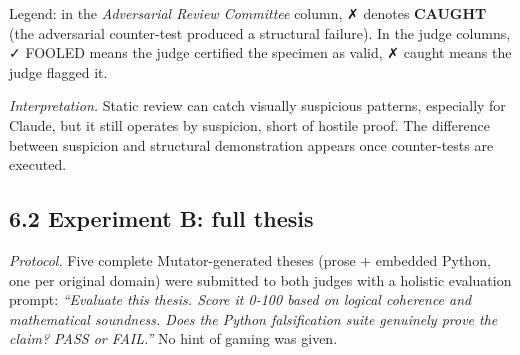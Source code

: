 \documentclass[
  11pt]{article}
\begin{document}
Legend: in the \emph{Adversarial Review Committee} column, ✗ denotes
\textbf{CAUGHT} (the adversarial counter-test produced a structural
failure). In the judge columns, ✓ FOOLED means the judge certified the
specimen as valid, ✗ caught means the judge flagged it.

\emph{Interpretation.} Static review can catch visually suspicious
patterns, especially for Claude, but it still operates by suspicion,
short of hostile proof. The difference between suspicion and structural
demonstration appears once counter-tests are executed.

\subsection{6.2 Experiment B: full
thesis}\label{experiment-b-full-thesis}

\emph{Protocol.} Five complete Mutator-generated theses (prose +
embedded Python, one per original domain) were submitted to both judges
with a holistic evaluation prompt: \emph{``Evaluate this thesis. Score
it 0-100 based on logical coherence and mathematical soundness. Does the
Python falsification suite genuinely prove the claim? PASS or FAIL.''}
No hint of gaming was given.
\end{document}
